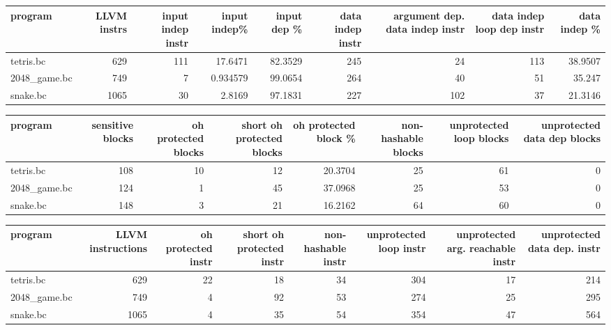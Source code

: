 \begin{tabular}{lrrrrrrrr}
\hline
 program      &   LLVM instrs &   input indep instr &   input indep\% &   input dep \% &   data indep instr &   argument dep. data indep instr &   data indep loop dep instr &   data indep \% \\
\hline
 tetris.bc    &           629 &                 111 &      17.6471   &       82.3529 &                245 &                               24 &                         113 &        38.9507 \\
 2048\_game.bc &           749 &                   7 &       0.934579 &       99.0654 &                264 &                               40 &                          51 &        35.247  \\
 snake.bc     &          1065 &                  30 &       2.8169   &       97.1831 &                227 &                              102 &                          37 &        21.3146 \\
\hline
\end{tabular}\begin{tabular}{lrrrrrrr}
\hline
 program      &   sensitive blocks &   oh protected blocks &   short oh protected blocks &   oh protected block \% &   non-hashable blocks &   unprotected loop blocks &   unprotected data dep blocks \\
\hline
 tetris.bc    &                108 &                    10 &                          12 &                20.3704 &                    25 &                        61 &                             0 \\
 2048\_game.bc &                124 &                     1 &                          45 &                37.0968 &                    25 &                        53 &                             0 \\
 snake.bc     &                148 &                     3 &                          21 &                16.2162 &                    64 &                        60 &                             0 \\
\hline
\end{tabular}\begin{tabular}{lrrrrrrr}
\hline
 program      &   LLVM instructions &   oh protected instr &   short oh protected instr &   non-hashable instr &   unprotected loop instr &   unprotected arg. reachable instr &   unprotected data dep. instr \\
\hline
 tetris.bc    &                 629 &                   22 &                         18 &                   34 &                      304 &                                 17 &                           214 \\
 2048\_game.bc &                 749 &                    4 &                         92 &                   53 &                      274 &                                 25 &                           295 \\
 snake.bc     &                1065 &                    4 &                         35 &                   54 &                      354 &                                 47 &                           564 \\
\hline
\end{tabular}